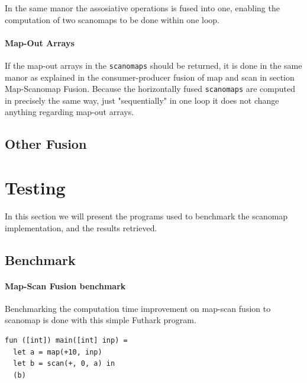 \documentclass[11pt]{article}
\begin{document}
In the same manor the assosiative operations is fused into one, enabling the computation of two scanomaps to be done within one loop. 

\paragraph{Map-Out Arrays}
If the map-out arrays in the \texttt{scanomaps} should be returned, it is done in the same manor as explained in the consumer-producer fusion of map and scan in section Map-Scanomap Fusion. Because the horizontally fused \texttt{scanomaps} are computed in precisely the same way, just "sequentially" in one loop it does not change anything regarding map-out arrays.

\subsection{Other Fusion}





\section{Testing}

In this section we will present the programs used to benchmark the scanomap implementation, and the results retrieved.

\subsection{Benchmark}

\paragraph*{Map-Scan Fusion benchmark}
Benchmarking the computation time improvement on map-scan fusion to scanomap is done with this simple Futhark program. 

\begin{lstlisting}[caption=Test program] 
fun ([int]) main([int] inp) =
  let a = map(+10, inp)
  let b = scan(+, 0, a) in
  (b)
\end{lstlisting}
\end{document}
